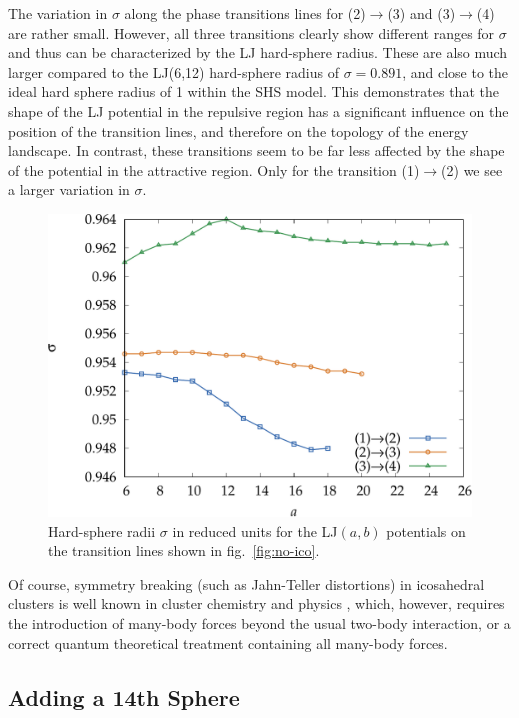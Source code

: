 The variation in $\sigma$ along the phase transitions lines for (2)$\rightarrow$(3)
and (3)$\rightarrow$(4) are rather small. However, all three
transitions clearly show different ranges for $\sigma$ and thus can be
characterized by the LJ hard-sphere radius. These are also
much larger compared to the LJ(6,12) hard-sphere radius of $\sigma=0.891$,
and close to the ideal hard sphere radius of 1 within the SHS model. 
This demonstrates that the shape of the LJ potential in the
repulsive region has a significant influence on the position of the transition lines, 
and therefore on the topology of the energy landscape. In contrast, these 
transitions seem to be far less affected by the shape of the potential in the attractive region. 
Only for the transition (1)$\rightarrow$(2) we see a larger variation in $\sigma$.
\begin{figure}[htb]\centering
    \includegraphics[width=.8\columnwidth]{gregory-newton/sigma.pdf}
    \caption{Hard-sphere radii $\sigma$ in reduced units for the LJ$(a,b)$
    potentials on the transition lines shown in fig.~\ref{fig:no-ico}.}
    \label{fig:hardsphere}
\end{figure}

Of course, symmetry breaking (such as Jahn-Teller distortions) in icosahedral
clusters is well known in cluster chemistry and physics
\autocite{deHeer_physicssimplemetal_1993}, which, however, requires the
introduction of many-body forces beyond the usual two-body interaction, or a
correct quantum theoretical treatment containing all many-body forces. 

\subsection{Adding a 14th Sphere}
\label{sec:addinga14thsphere}

